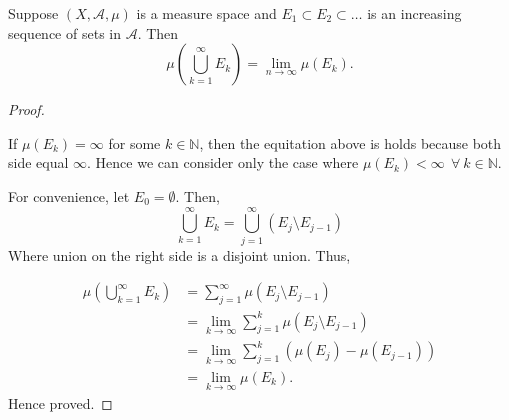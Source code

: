 \begin{theorem}
    \label{increasing}
    Suppose $(X,\mathcal{A},\mu)$ is a measure space and $E_1\subset E_2\subset\ldots$ is an increasing sequence of sets in $\mathcal{A}$. Then
    \[
        \mu\left( \bigcup_{k=1}^{\infty}E_k \right) = \lim_{n\to\infty}\mu(E_k).
    \]
\end{theorem}
\begin{proof}
    \
    \begin{center}
    \end{center}
    If $\mu(E_k)=\infty$ for some $k\in\mathds{N}$, then the equitation above is holds because both side equal $\infty$. Hence we can consider only the case where
    $\mu(E_k)<\infty\ \ \forall\ k\in\mathds{N}$.

    For convenience, let $E_0=\emptyset$. Then,
    \[
        \bigcup_{k=1}^{\infty}E_k=\bigcup_{j=1}^{\infty}(E_j\setminus E_{j-1})
    \]
    Where union on the right side is a disjoint union. Thus,

    \begin{align*}
        \mu\left( \bigcup_{k=1}^{\infty}E_k \right) &= \sum_{j=1}^{\infty}\mu(E_j\setminus E_{j-1})\\
                                                    &= \lim_{k\to\infty}\sum_{j=1}^{k}\mu(E_j\setminus E_{j-1})\\
                                                    &= \lim_{k\to\infty}\sum_{j=1}^{k}\left( \mu(E_j)-\mu(E_{j-1}) \right)\\
                                                    &= \lim_{k\to\infty}\mu(E_k).
    \end{align*}
    Hence proved.
\end{proof}

